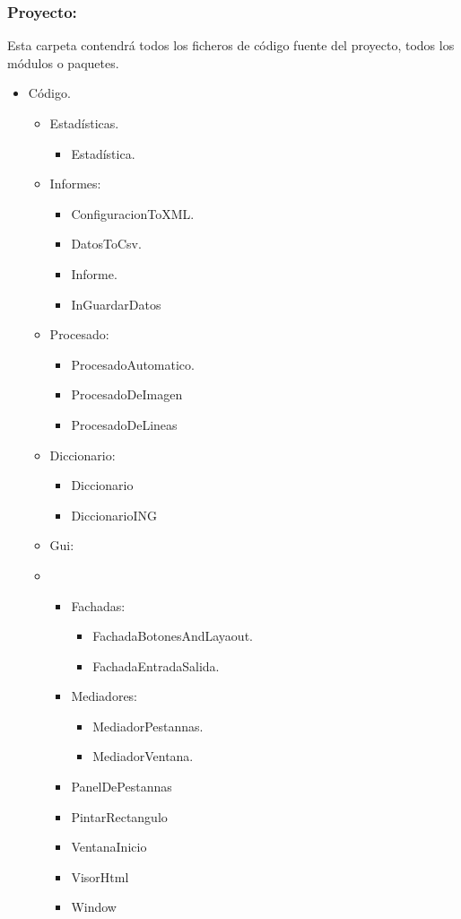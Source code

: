 \subsubsection{Proyecto:}
Esta carpeta contendrá todos los ficheros de código fuente del proyecto, todos los módulos o paquetes.
	\begin{itemize}
		\item Código.
		\begin{itemize}
			\item Estadísticas.
				\begin{itemize}
					\item Estadística.
				\end{itemize}
			\item Informes:
				\begin{itemize}
					\item ConfiguracionToXML.
					\item DatosToCsv.
					\item Informe.
					\item InGuardarDatos
				\end{itemize}
			\item Procesado:
				\begin{itemize}
					\item ProcesadoAutomatico.
					\item ProcesadoDeImagen
					\item ProcesadoDeLineas
				\end{itemize}
		\item Diccionario:
			\begin{itemize}
				\item Diccionario
				\item DiccionarioING
			\end{itemize}	
		\item Gui:
	\end{itemize}
	

\begin{itemize}
\item 
  
\begin{itemize}
		\item Fachadas:
			\begin{itemize}
				\item FachadaBotonesAndLayaout.
				\item FachadaEntradaSalida.
			\end{itemize}
		\item Mediadores:
			\begin{itemize}
				\item MediadorPestannas.
				\item MediadorVentana.
			\end{itemize}
		\item PanelDePestannas
		\item PintarRectangulo
		\item VentanaInicio
		\item VisorHtml
		\item Window
	\end{itemize}						
\end{itemize}
\end{itemize}

